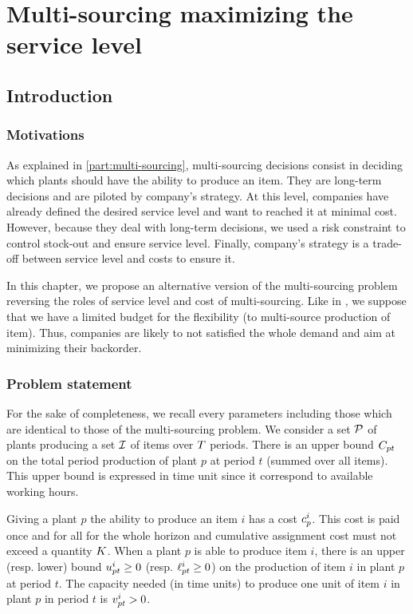 \chapter{Multi-sourcing maximizing the service level}



\section{Introduction}


\subsection{Motivations}


As explained in \cref{part:multi-sourcing}, multi-sourcing decisions consist in deciding which plants should have the ability to produce an item.
They are long-term decisions and are piloted by company's strategy.
At this level, companies have already defined the desired service level and want to reached it at minimal cost.
However, because they deal with long-term decisions, we used a risk constraint to control stock-out and ensure service level.
Finally, company's strategy is a trade-off between service level and costs to ensure it.


In this chapter, we propose an alternative version of the multi-sourcing problem reversing the roles of service level and cost of multi-sourcing.
Like in \cite{}, we suppose that we have a limited budget for the flexibility (\ie to multi-source production of item).
Thus, companies are likely to not satisfied the whole demand and aim at minimizing their backorder.




\subsection{Problem statement}

For the sake of completeness, we recall every parameters including those which are identical to those of the multi-sourcing problem.
We consider a set $\mathcal{P}$ of plants producing a set $\mathcal{I}$ of items over $T$ periods.
There is an upper bound $C_{pt}$ on the total period production of plant $p$ at period $t$ (summed over all items).
This upper bound is expressed in time unit since it correspond to available working hours.


Giving a plant $p$ the ability to produce an item $i$ has a cost $c_p^i$.
This cost is paid once and for all for the whole horizon and cumulative assignment cost must not exceed a quantity $K$.
When a plant $p$ is able to produce item $i$, there is an upper (resp. lower) bound $u_{pt}^i\ge 0$ (resp. $\ell_{pt}^i\ge 0$) on the production of item $i$ in plant $p$ at period $t$.
The capacity needed (in time units) to produce one unit of item $i$ in plant $p$ in period $t$ is $v_{pt}^i>0$.


